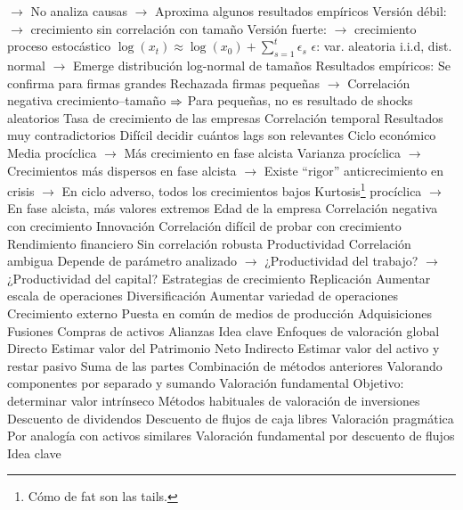 \documentclass{nuevotema}
\begin{document}
\begin{esquemal}
				\4[] $\to$ No analiza causas
				\4[] $\to$ Aproxima algunos resultados empíricos
				\4 Versión débil:
				\4[] $\to$ crecimiento sin correlación con tamaño
				\4 Versión fuerte:
				\4[] $\to$ crecimiento proceso estocástico
				\4[] $\log (x_t) \approx \log(x_0) + \sum_{s=1}^t \epsilon_s$
				\4[] $\epsilon$: var. aleatoria i.i.d, dist. normal
				\4[] $\to$ Emerge distribución log-normal de tamaños
				\4 Resultados empíricos:
				\4[] Se confirma para firmas grandes
				\4[] Rechazada firmas pequeñas
				\4[] $\to$ Correlación negativa crecimiento--tamaño
				\4[] $\Rightarrow$ Para pequeñas, no es resultado de shocks aleatorios
			\3 Tasa de crecimiento de las empresas
				\4 Correlación temporal
				\4[] Resultados muy contradictorios
				\4[] Difícil decidir cuántos lags son relevantes
				\4 Ciclo económico
				\4[] Media procíclica
				\4[] $\to$ Más crecimiento en fase alcista
				\4[] Varianza procíclica
				\4[] $\to$ Crecimientos más dispersos en fase alcista
				\4[] $\to$ Existe ``rigor'' anticrecimiento en crisis
				\4[] $\to$ En ciclo adverso, todos los crecimientos bajos
				\4[] Kurtosis\footnote{Cómo de fat son las tails.} procíclica
				\4[] $\to$ En fase alcista, más valores extremos
				\4 Edad de la empresa
				\4[] Correlación negativa con crecimiento
				\4 Innovación
				\4[] Correlación difícil de probar con crecimiento
				\4 Rendimiento financiero
				\4[] Sin correlación robusta
				\4 Productividad
				\4[] Correlación ambigua
				\4[] Depende de parámetro analizado
				\4[] $\to$ ¿Productividad del trabajo?
				\4[] $\to$ ¿Productividad del capital?
		\2 Estrategias de crecimiento
			\3 Replicación
				\4 Aumentar escala de operaciones
			\3 Diversificación
				\4 Aumentar variedad de operaciones
			\3 Crecimiento externo
				\4 Puesta en común de medios de producción
				\4 Adquisiciones
				\4 Fusiones
				\4 Compras de activos
				\4 Alianzas
	\1 
		\2 Idea clave
			\3 Enfoques de valoración global
				\4 Directo
				\4[] Estimar valor del Patrimonio Neto
				\4 Indirecto
				\4[] Estimar valor del activo y restar pasivo
			\3 Suma de las partes
				\4 Combinación de métodos anteriores
				\4 Valorando componentes por separado
				\4[] y sumando
			\3 Valoración fundamental
				\4 Objetivo:
				\4[] determinar valor intrínseco
				\4 Métodos habituales de valoración de inversiones
				\4[] Descuento de dividendos
				\4[] Descuento de flujos de caja libres
			\3 Valoración pragmática
				\4 Por analogía con activos similares
		\2 Valoración fundamental por descuento de flujos
			\3 Idea clave

\end{esquemal}
\end{document}
